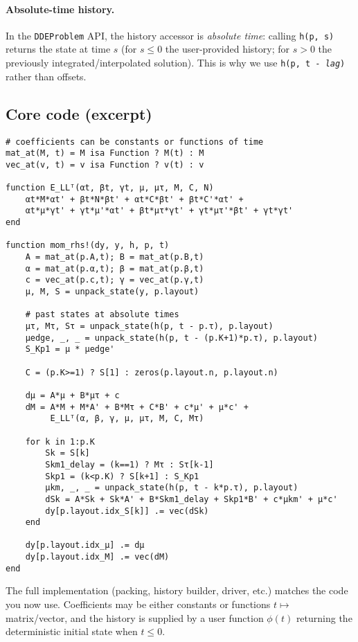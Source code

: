 \documentclass[11pt]{article}
\begin{document}
\paragraph{Absolute-time history.}
In the \texttt{DDEProblem} API, the history accessor is \emph{absolute time}: calling \texttt{h(p, s)} returns the state at time $s$ (for $s\le0$ the user-provided history; for $s>0$ the previously integrated/interpolated solution). This is why we use \texttt{h(p, t - \textit{lag})} rather than offsets.

\subsection*{Core code (excerpt)}
\begin{lstlisting}
# coefficients can be constants or functions of time
mat_at(M, t) = M isa Function ? M(t) : M
vec_at(v, t) = v isa Function ? v(t) : v

function E_LLᵀ(αt, βt, γt, μ, μτ, M, C, N)
    αt*M*αt' + βt*N*βt' + αt*C*βt' + βt*C'*αt' +
    αt*μ*γt' + γt*μ'*αt' + βt*μτ*γt' + γt*μτ'*βt' + γt*γt'
end

function mom_rhs!(dy, y, h, p, t)
    A = mat_at(p.A,t); B = mat_at(p.B,t)
    α = mat_at(p.α,t); β = mat_at(p.β,t)
    c = vec_at(p.c,t); γ = vec_at(p.γ,t)
    μ, M, S = unpack_state(y, p.layout)

    # past states at absolute times
    μτ, Mτ, Sτ = unpack_state(h(p, t - p.τ), p.layout)
    μedge, _, _ = unpack_state(h(p, t - (p.K+1)*p.τ), p.layout)
    S_Kp1 = μ * μedge'

    C = (p.K>=1) ? S[1] : zeros(p.layout.n, p.layout.n)

    dμ = A*μ + B*μτ + c
    dM = A*M + M*A' + B*Mτ + C*B' + c*μ' + μ*c' +
         E_LLᵀ(α, β, γ, μ, μτ, M, C, Mτ)

    for k in 1:p.K
        Sk = S[k]
        Skm1_delay = (k==1) ? Mτ : Sτ[k-1]
        Skp1 = (k<p.K) ? S[k+1] : S_Kp1
        μkm, _, _ = unpack_state(h(p, t - k*p.τ), p.layout)
        dSk = A*Sk + Sk*A' + B*Skm1_delay + Skp1*B' + c*μkm' + μ*c'
        dy[p.layout.idx_S[k]] .= vec(dSk)
    end

    dy[p.layout.idx_μ] .= dμ
    dy[p.layout.idx_M] .= vec(dM)
end
\end{lstlisting}

The full implementation (packing, history builder, driver, etc.) matches the code you now use. Coefficients may be either constants or functions $t\mapsto$ matrix/vector, and the history is supplied by a user function $\phi(t)$ returning the deterministic initial state when $t\le0$.
\end{document}

